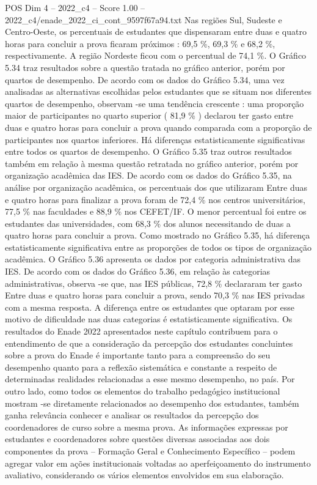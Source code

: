 \begin{textsample}{POS Dim 4 – 2022\_c4 – Score 1.00 – 2022\_c4/enade\_2022\_ci\_cont\_9597f67a94.txt}
Nas regiões Sul, Sudeste e Centro-Oeste, os percentuais de estudantes que dispensaram entre duas e quatro horas para concluir a prova ficaram próximos : 69,5 \%, 69,3 \% e 68,2 \%, respectivamente.
A região Nordeste ficou com o percentual de 74,1 \%.
O Gráfico 5.34 traz resultados sobre a questão tratada no gráfico anterior, porém por quartos de desempenho.
De acordo com os dados do Gráfico 5.34, uma vez analisadas as alternativas escolhidas pelos estudantes que se situam nos diferentes quartos de desempenho, observam -se uma tendência crescente : uma proporção maior de participantes no quarto superior ( 81,9 \% ) declarou ter gasto entre duas e quatro horas para concluir a prova quando comparada com a proporção de participantes nos quartos inferiores.
Há diferenças estatisticamente significativas entre todos os quartos de desempenho.
O Gráfico 5.35 traz outros resultados também em relação à mesma questão retratada no gráfico anterior, porém por organização acadêmica das IES.
De acordo com os dados do Gráfico 5.35, na análise por organização acadêmica, os percentuais dos que utilizaram Entre duas e quatro horas para finalizar a prova foram de 72,4 \% nos centros universitários, 77,5 \% nas faculdades e 88,9 \% nos CEFET/IF.
O menor percentual foi entre os estudantes das universidades, com 68,3 \% dos alunos necessitando de duas a quatro horas para concluir a prova.
Como mostrado no Gráfico 5.35, há diferença estatisticamente significativa entre as proporções de todos os tipos de organização acadêmica.
O Gráfico 5.36 apresenta os dados por categoria administrativa das IES.
De acordo com os dados do Gráfico 5.36, em relação às categorias administrativas, observa -se que, nas IES públicas, 72,8 \% declararam ter gasto Entre duas e quatro horas para concluir a prova, sendo 70,3 \% nas IES privadas com a mesma resposta.
A diferença entre os estudantes que optaram por esse motivo de dificuldade nas duas categorias é estatisticamente significativa.
Os resultados do Enade 2022 apresentados neste capítulo contribuem para o entendimento de que a consideração da percepção dos estudantes concluintes sobre a prova do Enade é importante tanto para a compreensão do seu desempenho quanto para a reflexão sistemática e constante a respeito de determinadas realidades relacionadas a esse mesmo desempenho, no país.
Por outro lado, como todos os elementos do trabalho pedagógico institucional mostram -se diretamente relacionados ao desempenho dos estudantes, também ganha relevância conhecer e analisar os resultados da percepção dos coordenadores de curso sobre a mesma prova.
As informações expressas por estudantes e coordenadores sobre questões diversas associadas aos dois componentes da prova – Formação Geral e Conhecimento Específico – podem agregar valor em ações institucionais voltadas ao aperfeiçoamento do instrumento avaliativo, considerando os vários elementos envolvidos em sua elaboração.

\end{textsample}
